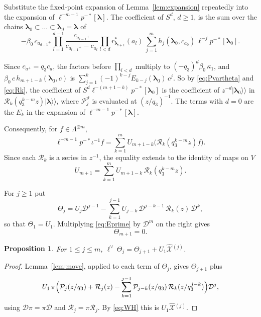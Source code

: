 \documentclass[11pt]{amsart}
\newtheorem{proposition}[theorem]{Proposition}
\theoremstyle{definition}
\theoremstyle{remark}
\newcommand{\betaz}{\beta_0}                     %
\newcommand{\La}{\Lambda}                        %
\newcommand{\bl}{{\boldsymbol{\lambda}}}         %
\newcommand{\cores}[2]{r^*_{#1}(#2)}             %
\newcommand{\Newton}[1]{E_{#1}}                  %
\newcommand{\ceig}[1]{c_{#1}}                    %
\newcommand{\bplus}[1]{{#1}^{+}}                 %
\newcommand{\kket}[1]{\lvert #1\rangle\!\rangle} %
\newcommand{\fix}[1]{[#1]}                       %
\newcommand{\taut}{\ell}                         %
\newcommand{\dtaut}{\taut^{\vee}}                %
\newcommand{\pulm}{p^{-*}}                       %
\newcommand{\Shift}{S}                           %
\newcommand{\Hiso}{\iota}                        %
\newcommand{\DD}{\mathcal D}
\newcommand{\Pser}[1]{\mathcal P_{#1}}           %
\newcommand{\Xhat}[1]{\widehat{\mathcal X}{}^{(#1)}}   %
\newcommand{\Rlast}[1]{\mathcal R_{#1}}          %
\begin{document}
Substitute the fixed-point expansion of Lemma~\ref{lem:expansion} repeatedly
into the expansion of \(\taut^{-m-1}\pulm\fix{\bl}\).
The coefficient of \(\Shift^d\), \(d\geq1\), is the
sum over the chains \(\bl_0\subset\dots\subset\bl_d=\bl\) of
\[
 -\betaz\,\ceig{\bplus{a_{d-1}}}\prod_{l=1}^{d-1}\frac{\ceig{\bplus{a_{l-1}}}}{\ceig{\bplus{a_{l-1}}}-\ceig{a_l}}
\prod_{l<d}\cores{\bl_{l+1}}{a_l}\ \sum_{j=1}^mh_j(\bl_0,\ceig{a_0})\,\taut^{-j}\pulm\fix{\bl_0}.
\]

Since \(\ceig{\bplus{a}}=q_3\ceig{a}\), the factors before \(\prod_{l<d}\) multiply to
\((-q_3)^d\betaz\,\kappa_1\), and \(\betaz\,c\,h_{m+1-k}(\bl_0,c)\) is
\(\sum_{j=1}^k(-1)^{k-j}\Newton{k-j}(\bl_0)\,c^j\). So by \eqref{eq:Pvartheta} and \eqref{eq:Rk}, the coefficient
of \(\Shift^d\taut^{-(m+1-k)}\pulm\fix{\bl_0}\) is the coefficient of \(z^{-d}\kket{\bl_0}\) in
\(\Rlast{k}(q_3^{k-m}z)\kket{\bl}\), where \(\Pser{j}^\vartheta\) is evaluated at \((z/q_3)^{-1}\). The terms
with \(d=0\) are the \(\Newton{k}\) in the expansion of \(\taut^{-m-1}\pulm\fix{\bl}\).

Consequently, for \(f\in\La^{\otimes m}\),
\[
 \taut^{-m-1}\pulm\Hiso^{-1}f=\sum_{k=1}^mU_{m+1-k}\bigl(\Rlast{k}(q_3^{k-m}z)f\bigr).
\]
Since each \(\Rlast{k}\) is a series in \(z^{-1}\), the equality extends to the identity of maps on \(V\)
\begin{equation}\label{eq:Eprime}
 U_{m+1}=\sum_{k=1}^mU_{m+1-k}\,\Rlast{k}(q_3^{k-m}z).
\end{equation}

For \(j\geq1\) put
\[
 \Theta_j=U_j\DD^{j-1}-\sum_{k=1}^{j-1}U_{j-k}\,\DD^{j-k-1}\,\Rlast{k}(z)\,\DD^k,
\]
so that \(\Theta_1=U_1\). Multiplying \eqref{eq:Eprime} by \(\DD^m\) on the right gives
\begin{equation}\label{eq:Thetam}
 \Theta_{m+1}=0.
\end{equation}

\begin{proposition}\label{prop:Theta}
For \(1\leq j\leq m\), \(\dtaut\,\Theta_j=\Theta_{j+1}+U_1\Xhat{j}\).
\end{proposition}

\begin{proof}
Lemma~\ref{lem:move}, applied to each term of \(\Theta_j\), gives \(\Theta_{j+1}\) plus
\[
 U_1\,\pi\Bigl(\Pser{j}(z/q_3)+\Rlast{j}(z)
 -\sum_{k=1}^{j-1}\Pser{j-k}(z/q_3)\,\Rlast{k}(z/q_3^{j-k})\Bigr)\DD^j,
\]
using \(\DD\pi=\pi\DD\) and \(\Rlast{j}=\pi\Rlast{j}\). By \eqref{eq:WH} this is \(U_1\Xhat{j}\).
\end{proof}
\end{document}

